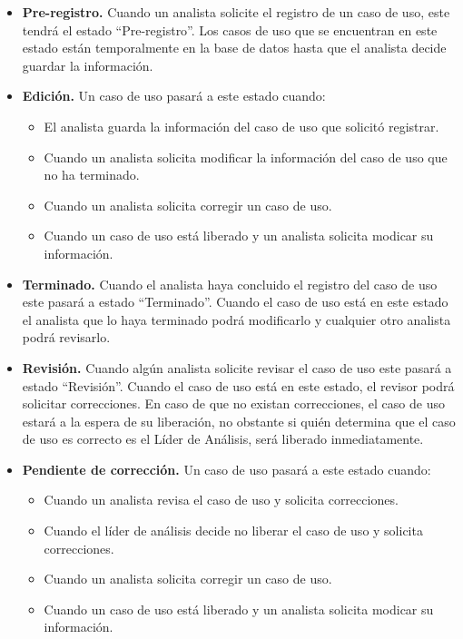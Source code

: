 \begin{itemize}
 \item {\bf Pre-registro.} Cuando un analista solicite el registro de un caso de uso, este tendrá el estado ``Pre-registro''.
 Los casos de uso que se encuentran en este estado están temporalmente en la base de datos hasta que el analista decide guardar la información.
 
 \item {\bf Edición.} Un caso de uso pasará a este estado cuando: 
 \begin{itemize}
  \item El analista guarda la información del caso de uso que solicitó registrar.
  \item Cuando un analista solicita modificar la información del caso de uso que no ha terminado.
  \item Cuando un analista solicita corregir un caso de uso.
  \item Cuando un caso de uso está liberado y un analista solicita modicar su información.
 \end{itemize}
 
 \item {\bf Terminado.} Cuando el analista haya concluido el registro del caso de uso este pasará a estado ``Terminado''. Cuando el caso de uso está en este estado
 el analista que lo haya terminado podrá modificarlo y cualquier otro analista podrá revisarlo.
 \item {\bf Revisión.} Cuando algún analista solicite revisar el caso de uso este pasará a estado ``Revisión''. Cuando el caso de uso está en este estado, el revisor podrá solicitar correcciones. En caso de que no existan correcciones, el caso de uso estará a la espera de su liberación, no obstante si quién determina que el caso de uso es correcto es el Líder de Análisis, será liberado inmediatamente.


 \item {\bf Pendiente de corrección.} Un caso de uso pasará a este estado cuando:
 \begin{itemize}
  \item Cuando un analista revisa el caso de uso y solicita correcciones.
  \item Cuando el líder de análisis decide no liberar el caso de uso y solicita correcciones.
  \item Cuando un analista solicita corregir un caso de uso.
  \item Cuando un caso de uso está liberado y un analista solicita modicar su información.
 \end{itemize}


\end{itemize}
